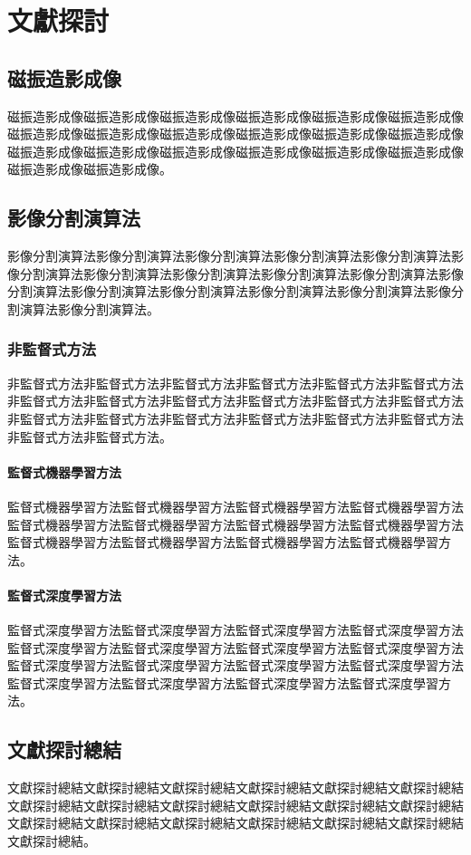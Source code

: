 
\chapter{文獻探討}

\section{磁振造影成像}
磁振造影成像磁振造影成像磁振造影成像磁振造影成像磁振造影成像磁振造影成像磁振造影成像磁振造影成像磁振造影成像磁振造影成像磁振造影成像磁振造影成像磁振造影成像磁振造影成像磁振造影成像磁振造影成像磁振造影成像磁振造影成像磁振造影成像磁振造影成像。

\section{影像分割演算法}
影像分割演算法影像分割演算法影像分割演算法影像分割演算法影像分割演算法影像分割演算法影像分割演算法影像分割演算法影像分割演算法影像分割演算法影像分割演算法影像分割演算法影像分割演算法影像分割演算法影像分割演算法影像分割演算法影像分割演算法。

\subsection{非監督式方法}
非監督式方法非監督式方法非監督式方法非監督式方法非監督式方法非監督式方法非監督式方法非監督式方法非監督式方法非監督式方法非監督式方法非監督式方法非監督式方法非監督式方法非監督式方法非監督式方法非監督式方法非監督式方法非監督式方法非監督式方法。

\subsubsection{監督式機器學習方法}
監督式機器學習方法監督式機器學習方法監督式機器學習方法監督式機器學習方法監督式機器學習方法監督式機器學習方法監督式機器學習方法監督式機器學習方法監督式機器學習方法監督式機器學習方法監督式機器學習方法監督式機器學習方法。

\subsubsection{監督式深度學習方法}
監督式深度學習方法監督式深度學習方法監督式深度學習方法監督式深度學習方法監督式深度學習方法監督式深度學習方法監督式深度學習方法監督式深度學習方法監督式深度學習方法監督式深度學習方法監督式深度學習方法監督式深度學習方法監督式深度學習方法監督式深度學習方法監督式深度學習方法監督式深度學習方法。

\section{文獻探討總結}
文獻探討總結文獻探討總結文獻探討總結文獻探討總結文獻探討總結文獻探討總結文獻探討總結文獻探討總結文獻探討總結文獻探討總結文獻探討總結文獻探討總結文獻探討總結文獻探討總結文獻探討總結文獻探討總結文獻探討總結文獻探討總結文獻探討總結。